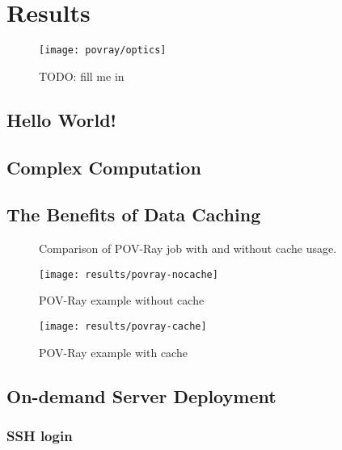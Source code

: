 
\chapter{Results}
\label{cha:results}

\begin{figure}[h]
  \begin{center}
    \texttt{[image: povray/optics]}
  \end{center}
  \caption[An advanced POV-Ray picture]{TODO: fill me in}
  \label{fig:pov-optics}
\end{figure}

\section{Hello World!}
\label{sec:hello-world}

\section{Complex Computation}
\label{sec:complex-example}


\section{The Benefits of Data Caching}
\label{sec:data-caching}

 \begin{figure}
   \label{fig:pov-cache-comparison}
   \caption{Comparison of POV-Ray job with and without cache usage.}
\end{figure}

\begin{figure}[ht]
  \centering
  \texttt{[image: results/povray-nocache]}
  \caption{POV-Ray example without cache}
  \label{fig:povray-nocache}
\end{figure}

\begin{figure}[ht]
  \centering
  \texttt{[image: results/povray-cache]}
  \caption{POV-Ray example with cache}
  \label{fig:povray-cache}
\end{figure}

\section{On-demand Server Deployment}
\label{sec:on-demand-server-deployment}

\subsection{SSH login}



